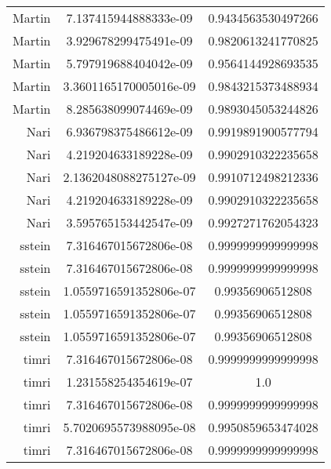 \begin{tabular}{@{}r c c@{}}
    Martin & 7.137415944888333e-09 & 0.9434563530497266 \\
    Martin & 3.929678299475491e-09 & 0.9820613241770825 \\
    Martin & 5.797919688404042e-09 & 0.9564144928693535 \\
    Martin & 3.3601165170005016e-09 & 0.9843215373488934 \\
    Martin & 8.285638099074469e-09 & 0.9893045053244826 \\
    Nari & 6.936798375486612e-09 & 0.9919891900577794 \\
    Nari & 4.219204633189228e-09 & 0.9902910322235658 \\
    Nari & 2.1362048088275127e-09 & 0.9910712498212336 \\
    Nari & 4.219204633189228e-09 & 0.9902910322235658 \\
    Nari & 3.595765153442547e-09 & 0.9927271762054323 \\
    sstein & 7.316467015672806e-08 & 0.9999999999999998 \\
    sstein & 7.316467015672806e-08 & 0.9999999999999998 \\
    sstein & 1.0559716591352806e-07 & 0.99356906512808 \\
    sstein & 1.0559716591352806e-07 & 0.99356906512808 \\
    sstein & 1.0559716591352806e-07 & 0.99356906512808 \\
    timri & 7.316467015672806e-08 & 0.9999999999999998 \\
    timri & 1.231558254354619e-07 & 1.0 \\
    timri & 7.316467015672806e-08 & 0.9999999999999998 \\
    timri & 5.7020695573988095e-08 & 0.9950859653474028 \\
    timri & 7.316467015672806e-08 & 0.9999999999999998 \\
    \bottomrule
\end{tabular}
